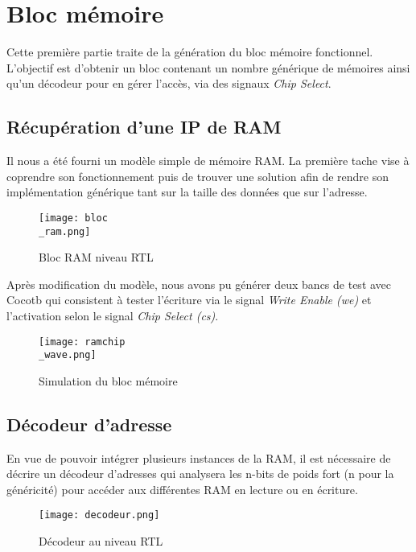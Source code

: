 \section{Bloc mémoire}

\indent Cette première partie traite de la génération du bloc mémoire fonctionnel. L'objectif est d'obtenir un bloc contenant un nombre générique de mémoires ainsi qu'un décodeur pour en gérer l'accès, via des signaux \textit{Chip Select}.

\subsection{Récupération d'une IP de RAM}

\indent Il nous a été fourni un modèle simple de mémoire RAM. La première tache vise à coprendre son fonctionnement puis de trouver une solution afin de rendre son implémentation générique tant sur la taille des données que sur l'adresse.

\begin{figure}[h]
	\centering
	\texttt{[image: bloc\\\_ram.png]}
	\caption{Bloc RAM niveau RTL}
	\label{fig:synth_bloc_ram}
\end{figure}

\indent Après modification du modèle, nous avons pu générer deux bancs de test avec Cocotb qui consistent à tester l'écriture via le signal \textit{Write Enable (we)} et l'activation selon le signal \textit{Chip Select (cs)}.

\begin{figure}[h]
	\centering
	\texttt{[image: ramchip\\\_wave.png]}
	\caption{Simulation du bloc mémoire}
	\label{fig:wave_bloc_ram}
\end{figure}

\newpage

\subsection{Décodeur d'adresse}

\indent En vue de pouvoir intégrer plusieurs instances de la RAM, il est nécessaire de décrire un décodeur d'adresses qui analysera les n-bits de poids fort (n pour la généricité) pour accéder aux différentes RAM en lecture ou en écriture.

\begin{figure}[h]
	\centering
	\texttt{[image: decodeur.png]}
	\caption{Décodeur au niveau RTL}
	\label{fig:synth_bloc_decodeur}
\end{figure}

